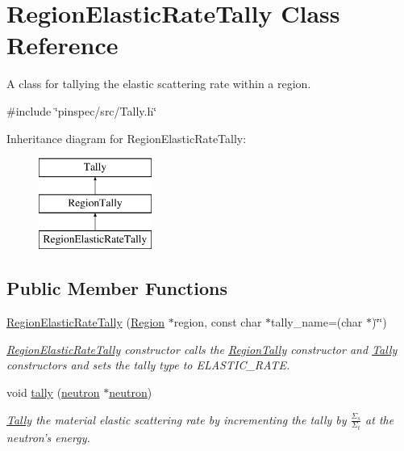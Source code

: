 \hypertarget{classRegionElasticRateTally}{\section{Region\-Elastic\-Rate\-Tally Class Reference}
\label{classRegionElasticRateTally}
}


A class for tallying the elastic scattering rate within a region.  




{\ttfamily \#include \char`\"{}pinspec/src/\-Tally.\-h\char`\"{}}

Inheritance diagram for Region\-Elastic\-Rate\-Tally\-:\begin{figure}[H]
\begin{center}
\leavevmode
\includegraphics[height=3.000000cm]{classRegionElasticRateTally}
\end{center}
\end{figure}
\subsection*{Public Member Functions}
\begin{DoxyCompactItemize}
\item 
\hyperlink{classRegionElasticRateTally_aab82cda6914a01240b7fdfe01ca08b33}{Region\-Elastic\-Rate\-Tally} (\hyperlink{classRegion}{Region} $\ast$region, const char $\ast$tally\-\_\-name=(char $\ast$)\char`\"{}\char`\"{})
\begin{DoxyCompactList}\small\item\em \hyperlink{classRegionElasticRateTally}{Region\-Elastic\-Rate\-Tally} constructor calls the \hyperlink{classRegionTally}{Region\-Tally} constructor and \hyperlink{classTally}{Tally} constructors and sets the tally type to E\-L\-A\-S\-T\-I\-C\-\_\-\-R\-A\-T\-E. \end{DoxyCompactList}\item 
void \hyperlink{classRegionElasticRateTally_aaafa18c6ed2d9d2da1437cb1d969fa29}{tally} (\hyperlink{structneutron}{neutron} $\ast$\hyperlink{structneutron}{neutron})
\begin{DoxyCompactList}\small\item\em \hyperlink{classTally}{Tally} the material elastic scattering rate by incrementing the tally by $ \frac{\Sigma_s}{\Sigma_t} $ at the neutron's energy. \end{DoxyCompactList}\end{DoxyCompactItemize}
